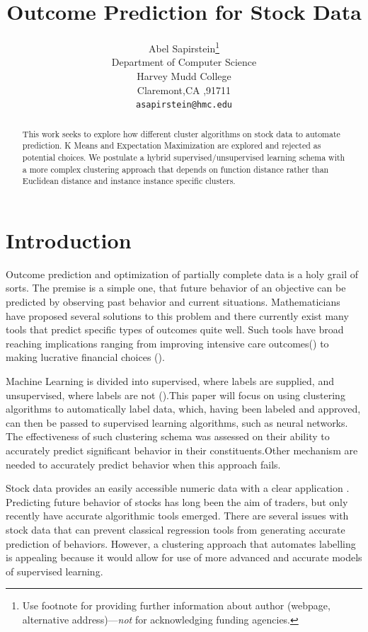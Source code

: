 \documentclass{article}
\title{Outcome Prediction for Stock Data}
\author{
  Abel Sapirstein\thanks{Use footnote for providing further
    information about author (webpage, alternative
    address)---\emph{not} for acknowledging funding agencies.} \\
  Department of Computer Science\\
  Harvey Mudd College\\
  Claremont,CA ,91711 \\
  \texttt{asapirstein@hmc.edu} 
}
\begin{document}

\maketitle

\begin{abstract}
This work seeks to explore how different cluster algorithms on stock data to automate prediction. K Means and Expectation Maximization are explored and rejected as potential choices. We postulate a hybrid supervised/unsupervised learning schema with a more complex clustering approach that depends on function distance rather than Euclidean distance and instance instance specific clusters.  
\end{abstract}

\section{Introduction}

Outcome prediction and optimization  of partially complete data is a holy grail of sorts. The premise is a simple one, that future behavior of an objective  can be predicted by observing past behavior and current situations. Mathematicians have proposed several solutions to this problem and there currently exist many tools that predict specific types of outcomes quite well. Such tools have broad reaching implications ranging from improving intensive care outcomes(\cite{meiring}) to making lucrative financial choices (\cite{gerlein}). 

Machine Learning is divided into supervised, where labels are supplied, and unsupervised, where labels are not (\cite{murphy}).This paper will focus on using clustering algorithms to automatically label data, which, having been labeled and approved, can then be passed to supervised learning algorithms, such as neural networks. The effectiveness of such clustering schema was assessed on their ability to accurately predict significant behavior in their constituents.Other mechanism are needed to accurately predict behavior when this approach fails.

Stock data provides an easily accessible numeric data with a clear application . Predicting future behavior of stocks has long been the aim of traders, but only recently have accurate algorithmic tools emerged. There are several issues with stock data that can prevent classical regression tools from generating accurate prediction of behaviors. However, a clustering approach that automates labelling is appealing because it would allow for use of more advanced and accurate models of supervised learning. 
\end{document}
